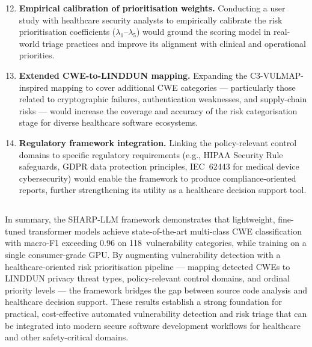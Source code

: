\documentclass[conference]{IEEEtran}
\begin{document}
\begin{enumerate}
    \setcounter{enumi}{11}
    \item \textbf{Empirical calibration of prioritisation weights.}
          Conducting a user study with healthcare security analysts to
          empirically calibrate the risk prioritisation coefficients
          ($\lambda_1$--$\lambda_5$) would ground the scoring model in
          real-world triage practices and improve its alignment with
          clinical and operational priorities.

    \item \textbf{Extended CWE-to-LINDDUN mapping.}
          Expanding the C3-VULMAP-inspired mapping to cover additional CWE
          categories --- particularly those related to cryptographic
          failures, authentication weaknesses, and supply-chain risks ---
          would increase the coverage and accuracy of the risk
          categorisation stage for diverse healthcare software ecosystems.

    \item \textbf{Regulatory framework integration.}
          Linking the policy-relevant control domains to specific
          regulatory requirements (e.g., HIPAA Security Rule safeguards,
          GDPR data protection principles, IEC~62443 for medical device
          cybersecurity) would enable the framework to produce
          compliance-oriented reports, further strengthening its utility
          as a healthcare decision support tool.
\end{enumerate}

\subsection*{}
In summary, the SHARP-LLM framework demonstrates that lightweight,
fine-tuned transformer models achieve state-of-the-art multi-class CWE
classification with macro-F1 exceeding 0.96 on 118~vulnerability
categories, while training on a single consumer-grade
GPU.  By augmenting vulnerability detection with a healthcare-oriented
risk prioritisation pipeline --- mapping detected CWEs to LINDDUN privacy
threat types, policy-relevant control domains, and ordinal priority
levels --- the framework bridges the gap between source code analysis and
healthcare decision support.  These results establish a strong foundation
for practical, cost-effective automated vulnerability detection and risk
triage that can be integrated into modern secure software development
workflows for healthcare and other safety-critical domains.
\end{document}

